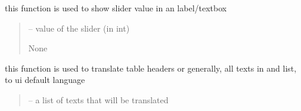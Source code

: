\documentclass[letterpaper,10pt,english]{sphinxmanual}
\begin{document}
\begin{savenotes}
\begin{fulllineitems}

\begin{savenotes}\begin{fulllineitems}
\label{\detokenize{setting/setting_UI:oxin.setting_UI.UI_main_window.show_value}}
\pysigstartsignatures
{}
\pysigstopsignatures
\sphinxAtStartPar
this function is used to show slider value in an label/textbox
\begin{quote}\begin{description}
\sphinxAtStartPar
{} – value of the slider (in int)

\sphinxAtStartPar
None

\end{description}\end{quote}

\end{fulllineitems}\end{savenotes}


\begin{savenotes}\begin{fulllineitems}
\label{\detokenize{setting/setting_UI:oxin.setting_UI.UI_main_window.staticMetaObject}}
\pysigstartsignatures
{}
\pysigstopsignatures
\end{fulllineitems}\end{savenotes}


\begin{savenotes}\begin{fulllineitems}
\label{\detokenize{setting/setting_UI:oxin.setting_UI.UI_main_window.translate_headers_list}}
\pysigstartsignatures
{}
\pysigstopsignatures
\sphinxAtStartPar
this function is used to translate table headers or generally, all texts in and list, to ui default language
\begin{quote}\begin{description}
\sphinxAtStartPar
{} – a list of texts that will be translated


\end{description}
\end{quote}
\end{fulllineitems}
\end{savenotes}
\end{fulllineitems}
\end{savenotes}
\end{document}

